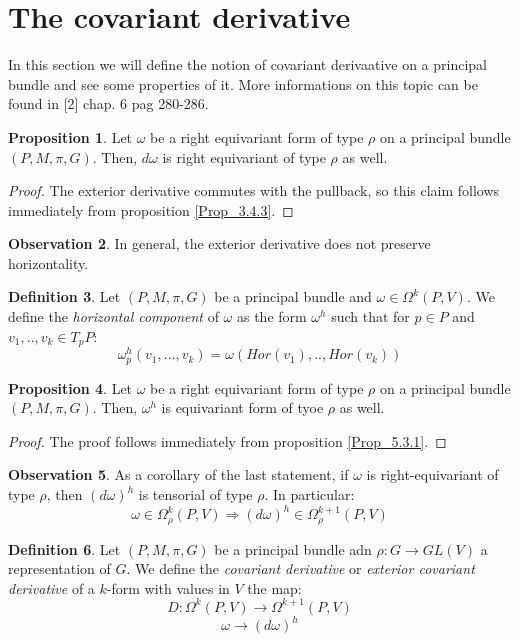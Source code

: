 \documentclass[12pt,a4paper]{report}
\theoremstyle{definition}
\newtheorem{Def}{Definition}[chapter]
\theoremstyle{Theorem}
\newtheorem{Prop}[Def]{Proposition}
\theoremstyle{definition}
\theoremstyle{definition}
\newtheorem{Obs}[Def]{Observation}
\begin{document}
	\section{The covariant derivative}
	In this section we will define the notion of covariant derivaative on a principal bundle and see some properties of it. More informations on this topic can be found in [2] chap. 6 pag 280-286.
	\begin{Prop}
		Let $\omega$ be a right equivariant form of type $\rho$ on a principal bundle $(P,M,\pi,G)$. Then, $d\omega$ is right equivariant of type $\rho$ as well.
	\end{Prop}
	\begin{proof}
		The exterior derivative commutes with the pullback, so this claim follows immediately from proposition \ref{Prop_3.4.3}.
	\end{proof}
	\begin{Obs}
		In general, the exterior derivative does not preserve horizontality.
	\end{Obs}
	\begin{Def}
		Let $(P,M,\pi,G)$ be a principal bundle and $\omega\in \Omega^k(P,V)$. We define the \textit{horizontal component} of $\omega$ as the form $\omega^h$ such that for $p\in P$ and $v_1,..,v_k\in T_pP$:
		$$\omega^h_p(v_1,...,v_k)=\omega(Hor(v_1),..,Hor(v_k))$$
	\end{Def}
	\begin{Prop}
		Let $\omega$ be a right equivariant form of type $\rho$ on a principal bundle $(P,M,\pi,G)$. Then, $\omega^h$ is equivariant form of tyoe $\rho$ as well.
	\end{Prop}
	\begin{proof}
		The proof follows immediately from proposition \ref{Prop_5.3.1}.
	\end{proof}
	\begin{Obs}
		As a corollary of the last statement, if $\omega$ is right-equivariant of type $\rho$, then $(d\omega)^h$ is tensorial of type $\rho$. In particular:
		$$\omega\in \Omega^k_\rho(P,V)\Rightarrow (d\omega)^h\in\Omega^{k+1}_\rho(P,V)$$
	\end{Obs}
	\begin{Def}
		Let $(P,M,\pi,G)$ be a principal bundle adn $\rho:G\rightarrow GL(V)$ a representation of $G$. We define the \textit{covariant derivative} or \textit{exterior covariant derivative} of a $k$-form with values in $V$ the map:
		$$D:\Omega^k(P,V)\rightarrow \Omega^{k+1}(P,V)$$
		$$\omega\rightarrow (d\omega)^h$$
	\end{Def}
\end{document}
